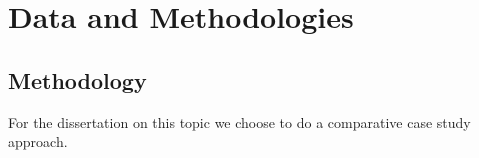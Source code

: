 \section{Data and Methodologies}
\subsection{Methodology}
For the dissertation on this topic we choose to do a comparative case
study approach.
